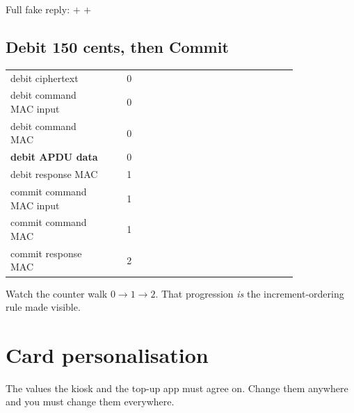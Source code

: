 Full fake reply:
 $+$  $+$ 

\subsection{Debit 150 cents, then Commit}

\begin{center}\small
\begin{tabular}{@{}L{0.34\linewidth}cL{0.48\linewidth}@{}}
\toprule
{} &  &  \\
\midrule
debit ciphertext           & 0 &  \\
debit command MAC input    & 0 & \newline{} \\
debit command MAC          & 0 &  \\
\textbf{debit APDU data}   & 0 & \newline{} \\
debit response MAC         & 1 &  \\
commit command MAC input   & 1 &  \\
commit command MAC         & 1 &  \\
commit response MAC        & 2 &  \\
\bottomrule
\end{tabular}
\end{center}

Watch the counter walk $0 \rightarrow 1 \rightarrow 2$. That progression
\emph{is} the increment-ordering rule made visible.

\section{Card personalisation}

The values the kiosk and the top-up app must agree on. Change them anywhere and
you must change them everywhere.

